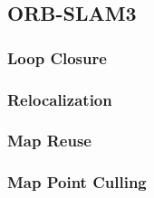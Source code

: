 \subsection{ORB-SLAM3}



\subsubsection{Loop Closure}
\subsubsection{Relocalization}
\subsubsection{Map Reuse}
\subsubsection{Map Point Culling}